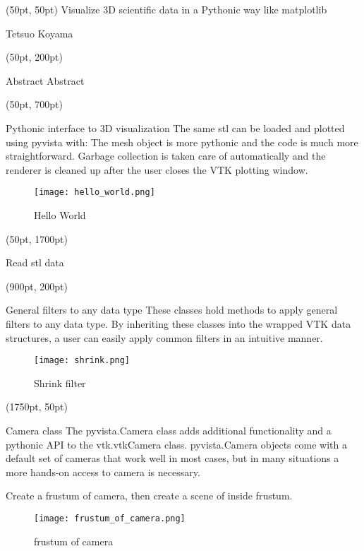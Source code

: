 \documentclass[final]{beamer}
\begin{document}
\begin{textblock*}{3450pt}(50pt, 50pt)
\Huge Visualize 3D scientific data in a Pythonic way like matplotlib

\Large Tetsuo Koyama
\end{textblock*}

\begin{textblock*}{800pt}(50pt, 200pt)
\begin{block}{Abstract}
Abstract
\end{block}
\end{textblock*}

\begin{textblock*}{800pt}(50pt, 700pt)
\begin{block}{Pythonic interface to 3D visualization}
The same stl can be loaded and plotted using pyvista with:
The mesh object is more pythonic and the code is much more straightforward.
Garbage collection is taken care of automatically and the renderer is cleaned up after the user closes the VTK plotting window.
\begin{figure}
\texttt{[image: hello\_world.png]}
\caption{Hello World}
\end{figure}
\end{block}
\end{textblock*}

\begin{textblock*}{800pt}(50pt, 1700pt)
\begin{block}{Read stl data}
\end{block}
\end{textblock*}

\begin{textblock*}{800pt}(900pt, 200pt)
\begin{block}{General filters to any data type}
These classes hold methods to apply general filters to any data type.
By inheriting these classes into the wrapped VTK data structures, a user can easily apply common filters in an intuitive manner.
\begin{figure}
\texttt{[image: shrink.png]}
\caption{Shrink filter}
\end{figure}
\end{block}
\end{textblock*}

\begin{textblock*}{800pt}(1750pt, 50pt)
\begin{block}{Camera class}
The pyvista.Camera class adds additional functionality and a pythonic API to the vtk.vtkCamera class.
pyvista.Camera objects come with a default set of cameras that work well in most cases,
but in many situations a more hands-on access to camera is necessary.

Create a frustum of camera, then create a scene of inside frustum.

\begin{figure}
\texttt{[image: frustum\_of\_camera.png]}
\caption{frustum of camera}
\end{figure}
\end{block}
\end{textblock*}
\end{document}
